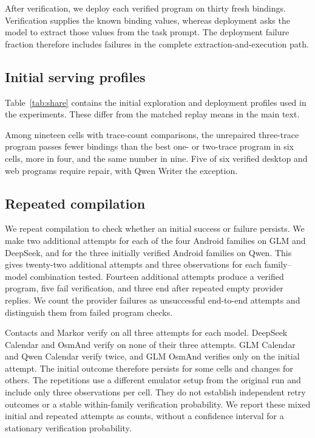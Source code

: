 After verification, we deploy each verified program on thirty fresh bindings.
Verification supplies the known binding values, whereas deployment asks the model to extract those values from the task prompt.
The deployment failure fraction therefore includes failures in the complete extraction-and-execution path.

\subsection{Initial serving profiles}
\label{app:serving-profiles}
Table~\ref{tab:share} contains the initial exploration and deployment profiles used in the experiments.
These differ from the matched replay means in the main text.


Among nineteen cells with trace-count comparisons, the unrepaired three-trace program passes fewer bindings than the best one- or two-trace program in six cells, more in four, and the same number in nine.
Five of six verified desktop and web programs require repair, with Qwen Writer the exception.

\subsection{Repeated compilation}\label{app:measurement-checks}
\label{sec:extensions}
\label{sec:verification}

We repeat compilation to check whether an initial success or failure persists.
We make two additional attempts for each of the four Android families on GLM and DeepSeek, and for the three initially verified Android families on Qwen.
This gives twenty-two additional attempts and three observations for each family--model combination tested.
Fourteen additional attempts produce a verified program, five fail verification, and three end after repeated empty provider replies.
We count the provider failures as unsuccessful end-to-end attempts and distinguish them from failed program checks.



Contacts and Markor verify on all three attempts for each model.
DeepSeek Calendar and OsmAnd verify on none of their three attempts.
GLM Calendar and Qwen Calendar verify twice, and GLM OsmAnd verifies only on the initial attempt.
The initial outcome therefore persists for some cells and changes for others.
The repetitions use a different emulator setup from the original run and include only three observations per cell.
They do not establish independent retry outcomes or a stable within-family verification probability.
We report these mixed initial and repeated attempts as counts, without a confidence interval for a stationary verification probability.

